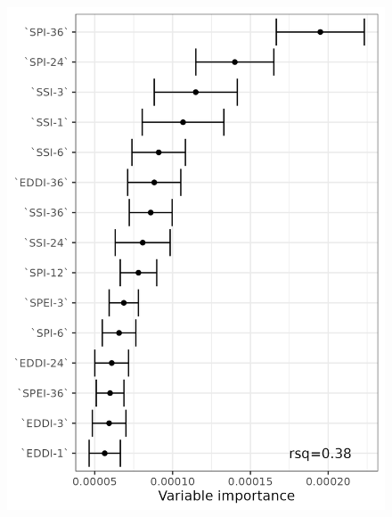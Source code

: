 \documentclass[
  authoryear,
  preprint,
  3p,
  onecolumn]{elsarticle}
\begin{document}
\begin{figure}[!ht]
\begin{minipage}{0.33\linewidth}
{\includegraphics[width=1\textwidth,height=\textheight]{figs/fig_errorbar_resample_random_forest_trends_Shrubland_norte grande.png}

}


\end{minipage}%
%
\begin{minipage}{0.33\linewidth}

\centering{

}
\end{minipage}
\end{figure}
\end{document}
